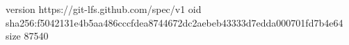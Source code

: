 version https://git-lfs.github.com/spec/v1
oid sha256:f5042131e4b5aa486cccfdea8744672dc2aebeb43333d7edda000701fd7b4e64
size 87540
